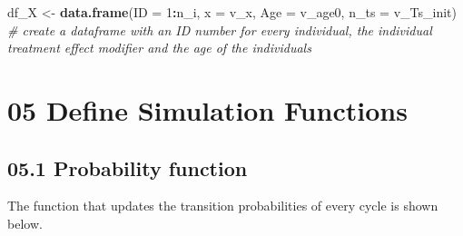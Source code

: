 \documentclass[
]{article}
\newenvironment{Shaded}{\begin{snugshade}}{\end{snugshade}}
\newcommand{\CommentTok}[1]{\textcolor[rgb]{0.56,0.35,0.01}{\textit{#1}}}
\newcommand{\DataTypeTok}[1]{\textcolor[rgb]{0.13,0.29,0.53}{#1}}
\newcommand{\DecValTok}[1]{\textcolor[rgb]{0.00,0.00,0.81}{#1}}
\newcommand{\KeywordTok}[1]{\textcolor[rgb]{0.13,0.29,0.53}{\textbf{#1}}}
\newcommand{\NormalTok}[1]{#1}
\newcommand{\OperatorTok}[1]{\textcolor[rgb]{0.81,0.36,0.00}{\textbf{#1}}}
\newcommand{\StringTok}[1]{\textcolor[rgb]{0.31,0.60,0.02}{#1}}
\begin{document}
\begin{Shaded}
\begin{Highlighting}[]
\NormalTok{df_X    <-}\StringTok{ }\KeywordTok{data.frame}\NormalTok{(}\DataTypeTok{ID =} \DecValTok{1}\OperatorTok{:}\NormalTok{n_i, }\DataTypeTok{x =}\NormalTok{ v_x, }\DataTypeTok{Age =}\NormalTok{ v_age0, }\DataTypeTok{n_ts =}\NormalTok{ v_Ts_init) }\CommentTok{# create a dataframe with an ID number for every individual, the individual treatment effect modifier and the age of the individuals }
\end{Highlighting}
\end{Shaded}

\hypertarget{define-simulation-functions}{%
\section{05 Define Simulation
Functions}\label{define-simulation-functions}}

\hypertarget{probability-function}{%
\subsection{05.1 Probability function}\label{probability-function}}

The function that updates the transition probabilities of every cycle is
shown below.
\end{document}
